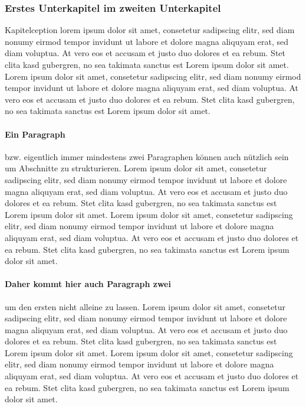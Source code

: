 \subsubsection{Erstes Unterkapitel im zweiten Unterkapitel}\label{sec:AmBestenImmerAussagekräftigeLabelVerwenden}
Kapitelception lorem ipsum dolor sit amet, consetetur sadipscing elitr, sed diam nonumy eirmod tempor invidunt ut labore et dolore magna aliquyam erat, sed diam voluptua. At vero eos et accusam et justo duo dolores et ea rebum. Stet clita kasd gubergren, no sea takimata sanctus est Lorem ipsum dolor sit amet. Lorem ipsum dolor sit amet, consetetur sadipscing elitr, sed diam nonumy eirmod tempor invidunt ut labore et dolore magna aliquyam erat, sed diam voluptua. At vero eos et accusam et justo duo dolores et ea rebum. Stet clita kasd gubergren, no sea takimata sanctus est Lorem ipsum dolor sit amet.
%
\paragraph{Ein Paragraph} bzw. eigentlich immer mindestens zwei Paragraphen können auch nützlich sein um Abschnitte zu strukturieren.
Lorem ipsum dolor sit amet, consetetur sadipscing elitr, sed diam nonumy eirmod tempor invidunt ut labore et dolore magna aliquyam erat, sed diam voluptua. At vero eos et accusam et justo duo dolores et ea rebum. Stet clita kasd gubergren, no sea takimata sanctus est Lorem ipsum dolor sit amet. Lorem ipsum dolor sit amet, consetetur sadipscing elitr, sed diam nonumy eirmod tempor invidunt ut labore et dolore magna aliquyam erat, sed diam voluptua. At vero eos et accusam et justo duo dolores et ea rebum. Stet clita kasd gubergren, no sea takimata sanctus est Lorem ipsum dolor sit amet.

\paragraph{Daher kommt hier auch Paragraph zwei} um den ersten nicht alleine zu lassen.
Lorem ipsum dolor sit amet, consetetur sadipscing elitr, sed diam nonumy eirmod tempor invidunt ut labore et dolore magna aliquyam erat, sed diam voluptua. At vero eos et accusam et justo duo dolores et ea rebum. Stet clita kasd gubergren, no sea takimata sanctus est Lorem ipsum dolor sit amet. Lorem ipsum dolor sit amet, consetetur sadipscing elitr, sed diam nonumy eirmod tempor invidunt ut labore et dolore magna aliquyam erat, sed diam voluptua. At vero eos et accusam et justo duo dolores et ea rebum. Stet clita kasd gubergren, no sea takimata sanctus est Lorem ipsum dolor sit amet.

